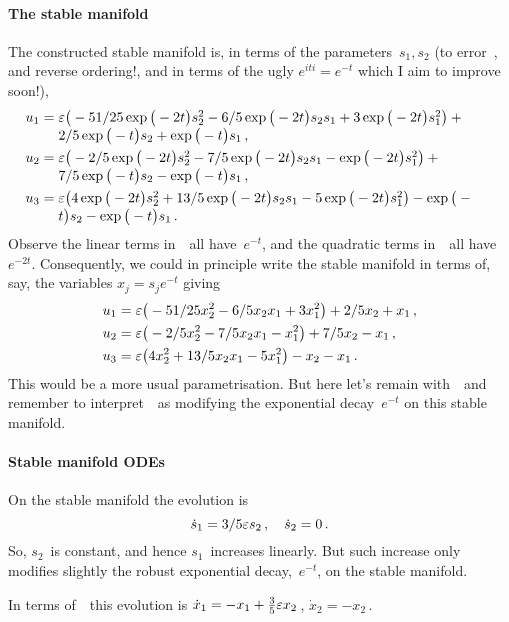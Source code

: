 \paragraph{The stable manifold} 
The constructed stable manifold is, in terms of the parameters~\(s_1,s_2\) (to error~, and reverse ordering!, and in terms of the ugly \(e^{iti}=e^{-t}\) which I aim to improve soon!), 
\begin{align*}&
u_{1}=\ParMath{\eps \big(-51/25 \exp \big(-2 t\big) s_{2}^{2}-6/5 \exp \big(-2 t
\big) s_{2} s_{1}+3 \exp \big(-2 t\big) s_{1}^{2}\big)+2/5 \exp \big(-t
\big) s_{2}+\exp \big(-t\big) s_{1}
\,,}
\\&
u_{2}=\ParMath{\eps \big(-2/5 \exp \big(-2 t\big) s_{2}^{2}-7/5 \exp \big(-2 t
\big) s_{2} s_{1}-\exp \big(-2 t\big) s_{1}^{2}\big)+7/5 \exp \big(-t
\big) s_{2}-\exp \big(-t\big) s_{1}
\,,}
 \\&
u_{3}=\ParMath{\eps \big(4 \exp \big(-2 t\big) s_{2}^{2}+13/5 \exp \big(-2 t\big)
 s_{2} s_{1}-5 \exp \big(-2 t\big) s_{1}^{2}\big)-\exp \big(-t\big) s_{2
}-\exp \big(-t\big) s_{1}
\,.}
\end{align*}
Observe the linear terms in~\sv\ all have~\(e^{-t}\), and the quadratic terms in~\sv\ all have~\(e^{-2t}\).
Consequently, we could in principle write the stable manifold in terms of, say, the variables \(x_j=s_je^{-t}\) giving  
\begin{align*}&
u_{1}=\varepsilon \big(-51/25 x_{2}^{2}-6/5 x_{2} x_{1}+3 x_{1}^{2}\big)+2/5 x_{2}+x_{1}\,, 
\\&
u_{2}=\varepsilon \big(-2/5 x_{2}^{2}-7/5 x_{2} x_{1}- x_{1}^{2}\big)+7/5  x_{2}- x_{1}
\,, \\&
u_{3}=\varepsilon \big(4 x_{2}^{2}+13/5 x_{2} x_{1}-5 x_{1}^{2}\big)- x_{2
}- x_{1}\,.
\end{align*}
This would be a more usual parametrisation.  But here let's remain with~\sv\ and remember to interpret~\sv\ as modifying the exponential decay~\(e^{-t}\) on this stable manifold.


\paragraph{Stable manifold ODEs} 
On the stable manifold the evolution is
\begin{equation*}
\dot s_{1}=3/5 \varepsilon s_{2}\,,\quad
\dot s_{2}=0\,.
\end{equation*}
So, \(s_2\)~is constant, and hence \(s_1\)~increases linearly.  
But such increase only modifies slightly the robust exponential decay,~\(e^{-t}\), on the stable manifold. 

In terms of~\xv\ this evolution is \(\dot x_1=-x_1+\tfrac35\varepsilon x_2\)\,, \(\dot x_2=-x_2\)\,.

